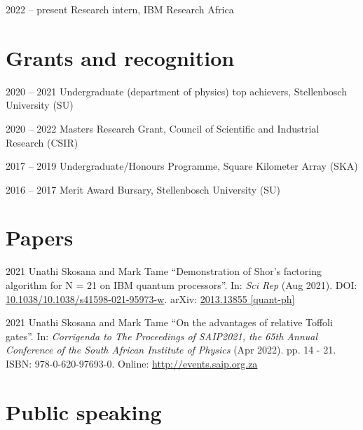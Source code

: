 \documentclass[letterpaper, 11pt]{report}
\begin{document}
    \begin{tablist}
      \item[2022 -- present]  \tab{} Research intern, IBM Research Africa
    \end{tablist}

    \section*{Grants and recognition}

    \begin{tablist}
		  \item[2020 -- 2021] \tab{} Undergraduate (department of physics) top achievers, Stellenbosch University (SU)
		  \item[2020 -- 2022]  \tab{} Masters Research Grant, Council of Scientific and Industrial Research (CSIR)
		  \item[2017 -- 2019]  \tab{} Undergraduate/Honours Programme, Square Kilometer Array (SKA)
		  \item[2016 -- 2017]  \tab{} Merit Award Bursary, Stellenbosch University (SU)
	  \end{tablist}

    \section*{Papers}

    \begin{tablist}
        \item[2021] \tab{}Unathi Skosana and Mark Tame \enquote{Demonstration of Shor’s factoring algorithm for N = 21 on IBM quantum processors}. In: \textit{Sci Rep} (Aug 2021). DOI: \href{https://doi.org/10.1038/s41598-021-95973-w}{10.1038/10.1038/s41598-021-95973-w}. arXiv: \href{https://arxiv.org/abs/2103.13855}{2013.13855 [quant-ph]}
        \item[2021] \tab{}Unathi Skosana and Mark Tame \enquote{On the advantages of relative
          Toffoli gates}. In: \textit{Corrigenda to The Proceedings of SAIP2021, the 65th  Annual Conference of
          the South African Institute of Physics} (Apr 2022). pp. 14 - 21. ISBN:
          978-0-620-97693-0. Online: \url{http://events.saip.org.za}

    \end{tablist}

    \newpage{}

    \section*{Public speaking}
\end{document}
